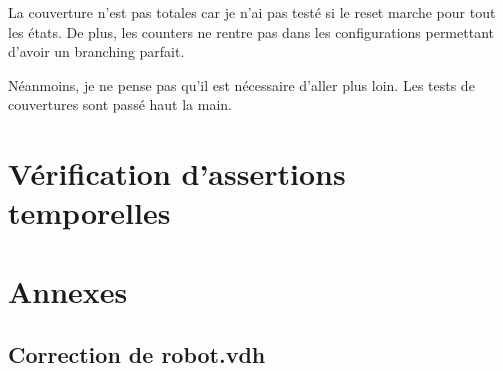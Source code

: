 \documentclass{article}
\newcommand{\sautligne}{
\textbf{\vspace{5mm}}
}
\begin{document}
La couverture n'est pas totales car je n'ai pas testé si le reset marche pour tout les états. De plus, les counters ne rentre pas dans les configurations permettant d'avoir un branching parfait. 
\sautligne 

Néanmoins, je ne pense pas qu'il est nécessaire d'aller plus loin. Les tests de couvertures sont passé haut la main.

\newpage


\section{Vérification d'assertions temporelles}

\section{Annexes}
\subsection{Correction de robot.vdh}
 
\end{document}
